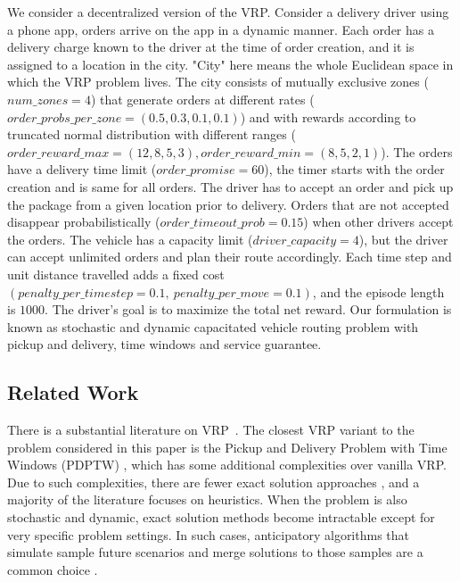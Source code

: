 We consider a decentralized version of the VRP. Consider a delivery driver using a phone app, orders arrive on the app in a dynamic manner. Each order has a delivery charge known to the driver at the time of order creation, and it is assigned to a location in the city. "City" here means the whole Euclidean space in which the VRP problem lives. The city consists of mutually exclusive zones ($num\_zones = 4$) that generate orders at different rates ($order\_probs\_per\_zone = (0.5, 0.3, 0.1, 0.1)$) and with rewards according to truncated normal distribution with different ranges ($order\_reward\_max = (12, 8, 5, 3), order\_reward\_min = (8, 5, 2, 1)$). The orders have a delivery time limit ($order\_promise = 60$), the timer starts with the order creation and is same for all orders. The driver has to accept an order and pick up the package from a given location prior to delivery. Orders that are not accepted disappear probabilistically ($order\_timeout\_prob = 0.15$) when other drivers accept the orders. The vehicle has a capacity limit ($driver\_capacity = 4$), but the driver can accept unlimited orders and plan their route accordingly.  
Each time step and unit distance travelled adds a fixed cost $(penalty\_per\_timestep = 0.1, \ penalty\_per\_move = 0.1)$, and the episode length is $1000$. The driver's goal is to maximize the total net reward. Our formulation is known as stochastic and dynamic capacitated vehicle routing problem with pickup and delivery, time windows and service guarantee. %

\subsection{Related Work} \label{sec_vrp_related_work}
There is a substantial literature on VRP~\cite{EKSIOGLU20091472}. The closest VRP variant to the problem considered in this paper is the Pickup and Delivery Problem with Time Windows (PDPTW) \cite{Cordeau2008}, which has some additional complexities over vanilla VRP. Due to such complexities, there are fewer exact solution approaches \cite{LuDessouky2004,MAHMOUDI201619}, and a majority of the literature focuses on heuristics. When the problem is also stochastic and dynamic, exact solution methods become intractable except for very specific problem settings. In such cases, anticipatory algorithms that simulate sample future scenarios and merge solutions to those samples are a common choice \cite{BERBEGLIA20108, Berhan2014, Ulrike2016, Ghiani2012}.

